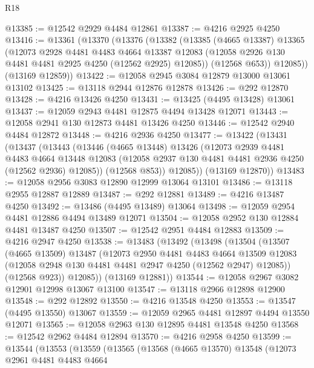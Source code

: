 \begin{lexlean}{R18}
\begin{coremodule}
@13385 := @12542 @2929 @4484 @12861
@13387 := @4216 @2925 @4250
@13416 := @13361
    (@13370
      (@13376
        (@13382
          (@13385
            (@4665 @13387)
            @13365
            (@12073
              @2928
              @4481
              @4483
              @4664
              @13387
              @12083
              (@12058 @2926 @130 @4481 @4481 @2925 @4250 (@12562 @2925) @12085))
            (@12568 @653))
          @12085))
      (@13169 @12859))
@13422 := @12058 @2945 @3084 @12879 @13000 @13061 @13102
@13425 := @13118 @2944 @12876 @12878
@13426 := @292 @12870
@13428 := @4216 @13426 @4250
@13431 := @13425 (@4495 @13428) @13061
@13437 := @12059 @2943 @4481 @12875 @4494 @13428 @12071
@13443 := @12058 @2941 @130 @12873 @4481 @13426 @4250
@13446 := @12542 @2940 @4484 @12872
@13448 := @4216 @2936 @4250
@13477 := @13422
    (@13431
      (@13437
        (@13443
          (@13446
            (@4665 @13448)
            @13426
            (@12073
              @2939
              @4481
              @4483
              @4664
              @13448
              @12083
              (@12058 @2937 @130 @4481 @4481 @2936 @4250 (@12562 @2936) @12085))
            (@12568 @853))
          @12085))
      (@13169 @12870))
@13483 := @12058 @2956 @3083 @12890 @12999 @13064 @13101
@13486 := @13118 @2955 @12887 @12889
@13487 := @292 @12881
@13489 := @4216 @13487 @4250
@13492 := @13486 (@4495 @13489) @13064
@13498 := @12059 @2954 @4481 @12886 @4494 @13489 @12071
@13504 := @12058 @2952 @130 @12884 @4481 @13487 @4250
@13507 := @12542 @2951 @4484 @12883
@13509 := @4216 @2947 @4250
@13538 := @13483
    (@13492
      (@13498
        (@13504
          (@13507
            (@4665 @13509)
            @13487
            (@12073
              @2950
              @4481
              @4483
              @4664
              @13509
              @12083
              (@12058 @2948 @130 @4481 @4481 @2947 @4250 (@12562 @2947) @12085))
            (@12568 @923))
          @12085))
      (@13169 @12881))
@13544 := @12058 @2967 @3082 @12901 @12998 @13067 @13100
@13547 := @13118 @2966 @12898 @12900
@13548 := @292 @12892
@13550 := @4216 @13548 @4250
@13553 := @13547 (@4495 @13550) @13067
@13559 := @12059 @2965 @4481 @12897 @4494 @13550 @12071
@13565 := @12058 @2963 @130 @12895 @4481 @13548 @4250
@13568 := @12542 @2962 @4484 @12894
@13570 := @4216 @2958 @4250
@13599 := @13544
    (@13553
      (@13559
        (@13565
          (@13568
            (@4665 @13570)
            @13548
            (@12073
              @2961
              @4481
              @4483
              @4664

\end{coremodule}
\end{lexlean}
